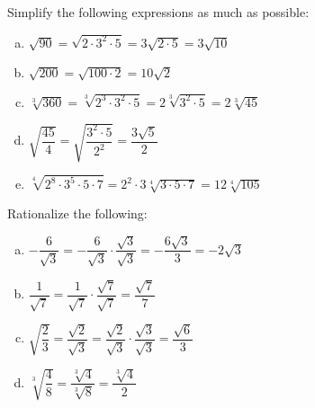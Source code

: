 \documentclass[11pt,letterpaper]{article}
\begin{document}
\vfill





 Simplify the following expressions as much as possible:
\begin{enumerate}[(a)] \itemsep=2ex
\item $\sqrt{90}= \sqrt{2 \cdot 3^2 \cdot 5}= 3 \sqrt{2 \cdot 5}= 3 \sqrt{10}$
\item $\sqrt{200}= \sqrt{100 \cdot 2}= 10 \sqrt{2}$
\item $\sqrt[3]{360}= \sqrt[3]{2^3 \cdot 3^2 \cdot 5}= 2 \sqrt[3]{3^2 \cdot 5}= 2 \sqrt[3]{45}$
\item $\sqrt{\dfrac{45}{4}}= \sqrt{\dfrac{3^2 \cdot 5}{2^2}}= \dfrac{3 \sqrt{5}}{2}$
\item $\sqrt[4]{2^8 \cdot 3^5 \cdot 5 \cdot 7}= 2^2 \cdot 3 \sqrt[4]{3 \cdot 5 \cdot 7}= 12 \sqrt[4]{105}$
\end{enumerate}





\vfill
\newpage





 Rationalize the following: \pspace
\begin{enumerate}[(a)] \itemsep=2ex
\item $-\dfrac{6}{\sqrt{3}}= -\dfrac{6}{\sqrt{3}} \cdot \dfrac{\sqrt{3}}{\sqrt{3}}= -\dfrac{6 \sqrt{3}}{3}= -2\sqrt{3}$
\item $\dfrac{1}{\sqrt{7}}= \dfrac{1}{\sqrt{7}} \cdot \dfrac{\sqrt{7}}{\sqrt{7}}= \dfrac{\sqrt{7}}{7}$
\item $\sqrt{\dfrac{2}{3}}= \dfrac{\sqrt{2}}{\sqrt{3}}= \dfrac{\sqrt{2}}{\sqrt{3}} \cdot \dfrac{\sqrt{3}}{\sqrt{3}}= \dfrac{\sqrt{6}}{3}$
\item $\sqrt[3]{\dfrac{4}{8}}= \dfrac{\sqrt[3]{4}}{\sqrt[3]{8}}= \dfrac{\sqrt[3]{4}}{2}$
\end{enumerate} 





\vfill
\end{document}
